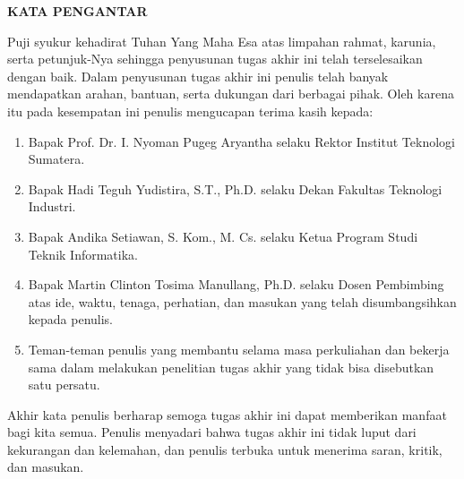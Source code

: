 \clearpage
{}%

\begin{justifying}
	\large \bfseries \centering \MakeUppercase{Kata Pengantar}\linebreak
	
	\normalsize \normalfont \justifying
	Puji syukur kehadirat Tuhan Yang Maha Esa atas limpahan rahmat, karunia, serta petunjuk-Nya sehingga penyusunan tugas akhir ini telah terselesaikan dengan baik. Dalam penyusunan tugas akhir ini penulis telah banyak mendapatkan arahan, bantuan, serta dukungan dari berbagai pihak. Oleh karena itu pada kesempatan ini penulis mengucapan terima kasih kepada: \par
	\begin{enumerate}
		\item Bapak Prof. Dr. I. Nyoman Pugeg Aryantha selaku Rektor Institut Teknologi Sumatera.  
		\item Bapak Hadi Teguh Yudistira, S.T., Ph.D. selaku Dekan Fakultas Teknologi Industri.
		\item Bapak Andika Setiawan, S. Kom., M. Cs. selaku Ketua Program Studi Teknik Informatika.
		\item Bapak Martin Clinton Tosima Manullang, Ph.D. selaku Dosen Pembimbing atas ide, waktu, tenaga, perhatian, dan masukan yang telah disumbangsihkan kepada penulis.
		\item Teman-teman penulis yang membantu selama masa perkuliahan dan bekerja sama dalam melakukan penelitian tugas akhir yang tidak bisa disebutkan satu persatu.
	\end{enumerate} \par
	Akhir kata penulis berharap semoga tugas akhir ini dapat memberikan manfaat bagi kita semua. Penulis menyadari bahwa tugas akhir ini tidak luput dari kekurangan dan kelemahan, dan penulis  terbuka untuk menerima saran, kritik, dan masukan.
	\vfill
	
\end{justifying}
\clearpage





